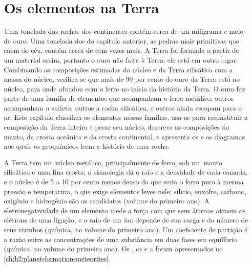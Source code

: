 \chapter{Os elementos na Terra}\label{ch:b2:elements-in-the-earth}

Uma tonelada das rochas dos continentes contém cerca de um miligrama e meio de
ouro. Uma tonelada dos  do capítulo anterior, as pedras mais
primitivas que caem do céu, contém cerca de cem vezes mais. A
Terra foi formada a partir de um material assim, portanto o ouro não falta à
Terra: ele está em outro lugar. Combinando as composições estimadas do núcleo e da
Terra silicática com a massa do núcleo, verifica-se que mais de 99 por cento do
ouro da Terra está no núcleo, para onde afundou com o ferro no início
da história da Terra. O ouro faz parte de uma família de elementos que acompanham o ferro
metálico; outros acompanham o sulfeto, outros a rocha silicática, e outros ainda escapam
para o ar. Este capítulo classifica os elementos nessas famílias, usa os
 para reconstituir a composição da Terra inteira e pesar seu
núcleo, descreve as composições do manto, da crosta oceânica e da
crosta continental, e apresenta os  e os diagramas nos quais
os geoquímicos leem a história de uma rocha.

\begin{recall}
A Terra tem um núcleo metálico, principalmente de ferro, sob um manto silicático e uma fina
crosta; a sismologia dá o raio e a densidade de cada camada, e o núcleo
é de 5 a 10 por cento menos denso do que seria o ferro puro à mesma pressão e
temperatura, o que exige elementos leves nele: silício, enxofre, carbono,
oxigênio e hidrogênio são os candidatos (volume do primeiro ano). A
eletronegatividade de um elemento mede a força com que seus átomos atraem os
elétrons de uma ligação, e o raio de um íon depende de sua carga e do
número de seus vizinhos (química, no volume do primeiro ano). Um coeficiente de
partição é a razão entre as concentrações de uma substância em duas fases em
equilíbrio (química, no volume do primeiro ano). Os , os  e a  foram apresentados no
\cref{ch:b2:planet-formation-meteorites}.
\end{recall}

